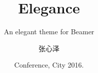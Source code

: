 
\title{Elegance}
\subtitle{An elegant theme for Beamer}
\author{张心泽}

\date{\footnotesize\color{mainthemecolour} Conference, City 2016. }

